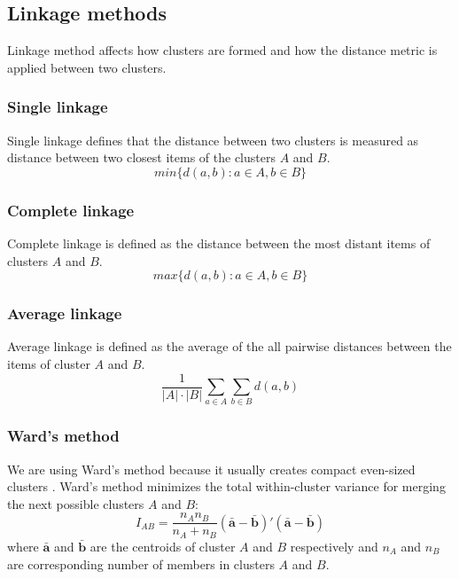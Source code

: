 

\subsection{Linkage methods}

Linkage method affects how clusters are formed and how the 
distance metric is applied between two clusters.

\subsubsection{Single linkage}
Single linkage defines that the distance between two clusters is 
measured as distance between two closest items of the clusters 
$A$ and $B$.
\begin{equation}
 min\{d(a,b):a \in A, b \in B\}
\end{equation}

\subsubsection{Complete linkage}
Complete linkage is defined as the distance between the most 
distant items of clusters $A$ and $B$.
\begin{equation}
 max\{d(a,b):a \in A, b \in B\}
\end{equation}

\subsubsection{Average linkage}
Average linkage is defined as the average of the all pairwise 
distances between the items of cluster $A$ and $B$.
\begin{equation}
 \frac{1}{|A| \cdot |B|} \sum_{a \in A} \sum_{b \in B}d(a,b)
\end{equation}

\subsubsection{Ward's method}
We are using Ward's method because it usually creates compact 
even-sized clusters \cite{strauss_generalising_2017}. Ward's 
method minimizes the total within-cluster variance for merging 
the next possible clusters $A$ and $B$:
\begin{equation}
 I_{AB} = \frac{n_A n_B}{n_A + n_B} (\bar{\textbf{a}} - \bar{\textbf{b}})'(\bar{\textbf{a}}-\bar{\textbf{b}})
\end{equation}
where $\bar{\textbf{a}}$ and $\bar{\textbf{b}}$ are the centroids
of cluster $A$ and $B$ respectively and $n_A$ and $n_B$ are
corresponding number of members in clusters $A$ and $B$.



